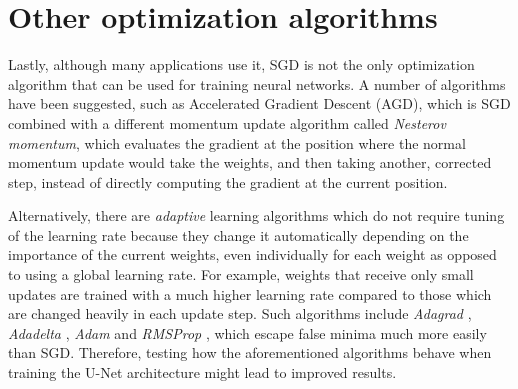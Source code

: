 	\section{Other optimization algorithms}

Lastly, although many applications use it, SGD is not the only optimization algorithm that can be used for training neural networks. A number of algorithms have been suggested, such as Accelerated Gradient Descent (AGD), which is SGD combined with a different momentum update algorithm called \textit{Nesterov momentum}, which evaluates the gradient at the position where the normal momentum update would take the weights, and then taking another, corrected step, instead of directly computing the gradient at the current position. \cite{nesterov}

Alternatively, there are \textit{adaptive} learning algorithms which do not require tuning of the learning rate because they change it automatically depending on the importance of the current weights, even individually for each weight as opposed to using a global learning rate. For example, weights that receive only small updates are trained with a much higher learning rate compared to those which are changed heavily in each update step. Such algorithms include \textit{Adagrad} \cite{adagrad}, \textit{Adadelta} \cite{adadelta}, \textit{Adam} \cite{adam} and \textit{RMSProp} \cite{rmsprop}, which escape false minima much more easily than SGD. Therefore, testing how the aforementioned algorithms behave when training the U-Net architecture might lead to improved results.
